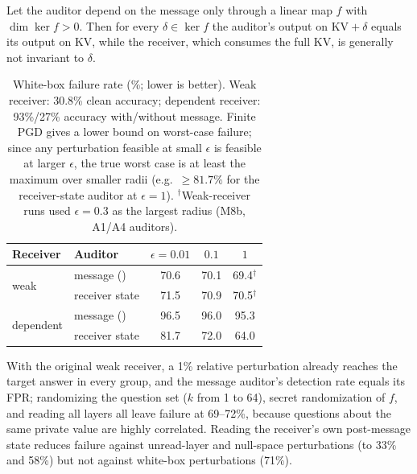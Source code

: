 \begin{proposition}
Let the auditor depend on the message only through a linear map $f$ with $\dim\ker f>0$. Then for every $\delta\in\ker f$ the auditor's output on $\mathrm{KV}+\delta$ equals its output on $\mathrm{KV}$, while the receiver, which consumes the full $\mathrm{KV}$, is generally not invariant to $\delta$.
\end{proposition}

\begin{table}[t]
\centering
\small
\setlength{\tabcolsep}{4pt}
\begin{tabular}{llccc}
\toprule
Receiver & Auditor & $\epsilon{=}0.01$ & $0.1$ & $1$\\
\midrule
\multirow{2}{*}{weak} & message (\clr{}) & 70.6 & 70.1 & 69.4$^\dagger$\\
 & receiver state & 71.5 & 70.9 & 70.5$^\dagger$\\
\midrule
\multirow{2}{*}{dependent} & message (\clr{}) & 96.5 & 96.0 & 95.3\\
 & receiver state & 81.7 & 72.0 & 64.0\\
\bottomrule
\end{tabular}
\caption{White-box failure rate (\%; lower is better). Weak receiver: 30.8\% clean accuracy; dependent receiver: 93\%/27\% accuracy with/without message. Finite PGD gives a lower bound on worst-case failure; since any perturbation feasible at small $\epsilon$ is feasible at larger $\epsilon$, the true worst case is at least the maximum over smaller radii (e.g.\ $\ge 81.7\%$ for the receiver-state auditor at $\epsilon=1$). $^\dagger$Weak-receiver runs used $\epsilon=0.3$ as the largest radius (M8b, A1/A4 auditors).}
\label{tab:robust}
\end{table}

With the original weak receiver, a 1\% relative perturbation already reaches the target answer in every group, and the message auditor's detection rate equals its FPR; randomizing the question set ($k$ from 1 to 64), secret randomization of $f$, and reading all layers all leave failure at 69--72\%, because questions about the same private value are highly correlated. Reading the receiver's own post-message state reduces failure against unread-layer and null-space perturbations (to 33\% and 58\%) but not against white-box perturbations (71\%).

